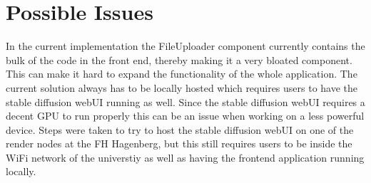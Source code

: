\documentclass[english,notitlepage,smartquotes]{hgbreport}
\begin{document}
\section{Possible Issues}
In the current implementation the FileUploader component currently contains the bulk of the code in the front end, thereby making it a very bloated component. This can make it hard to expand the functionality of the whole application. 
The current solution always has to be locally hosted which requires users to have the stable diffusion webUI running as well. Since the stable diffusion webUI requires a decent GPU to run properly this can be an issue when working on a less powerful device. Steps were taken to try to host the stable diffusion webUI on one of the render nodes at the FH Hagenberg, but this still requires users to be inside the WiFi network of the universtiy as well as having the frontend application running locally.


\appendix                                                   %


\MakeBibliography[nosplit]

\end{document}
